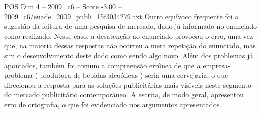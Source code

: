 \begin{textsample}{POS Dim 4 – 2009\_c6 – Score -3.00 – 2009\_c6/enade\_2009\_publi\_15f3034279.txt}
Outro equívoco frequente foi a sugestão da feitura de uma pesquisa de mercado, dado já informado no enunciado como realizado.
Nesse caso, a desatenção ao enunciado provocou o erro, uma vez que, na maioria dessas respostas não ocorreu a mera repetição do enunciado, mas sim o desenvolvimento deste dado como sendo algo novo.
Além dos problemas já apontados, também foi comum a compreensão errônea de que a empresa-problema ( produtora de bebidas alcoólicas ) seria uma cervejaria, o que direcionou a resposta para as soluções publicitárias mais visíveis neste segmento do mercado publicitário contemporâneo.
A escrita, de modo geral, apresentou erro de ortografia, o que foi evidenciado nos argumentos apresentados.

\end{textsample}
